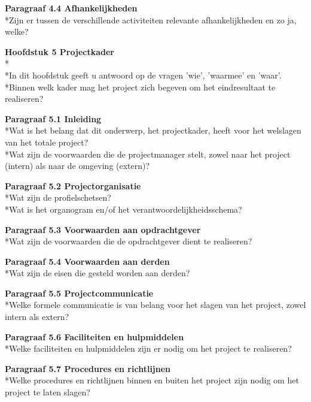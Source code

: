 \documentclass{article}
\begin{document}
\noindent
\textbf{Paragraaf 4.4 Afhankelijkheden}
\\*Zijn er tussen de verschillende activiteiten relevante afhankelijkheden en zo ja, welke?
\newline
\newline

\textbf{Hoofdstuk 5 Projectkader}
\\*
\\*In dit hoofdstuk geeft u antwoord op de vragen 'wie', 'waarmee' en 'waar'.
\\*Binnen welk kader mag het project zich begeven om het eindresultaat te realiseren?
\newline

\noindent
\textbf{Paragraaf 5.1 Inleiding}
\\*Wat is het belang dat dit onderwerp, het projectkader, heeft voor het welslagen van het totale project?
\\*Wat zijn de voorwaarden die de projectmanager stelt, zowel naar het project (intern) als naar de omgeving (extern)?
\newline

\noindent
\textbf{Paragraaf 5.2 Projectorganisatie}
\\*Wat zijn de profielschetsen?
\\*Wat is het organogram en/of het verantwoordelijkheidsschema?
\newline

\noindent
\textbf{Paragraaf 5.3 Voorwaarden aan opdrachtgever}
\\*Wat zijn de voorwaarden die de opdrachtgever dient te realiseren?
\newline

\noindent
\textbf{Paragraaf 5.4 Voorwaarden aan derden}
\\*Wat zijn de eisen die gesteld worden aan derden?
\newline

\noindent
\textbf{Paragraaf 5.5 Projectcommunicatie}
\\*Welke formele communicatie is van belang voor het slagen van het project, zowel intern als extern?
\newline

\noindent
\textbf{Paragraaf 5.6 Faciliteiten en hulpmiddelen}
\\*Welke faciliteiten en hulpmiddelen zijn er nodig om het project te realiseren?
\newline

\noindent
\textbf{Paragraaf 5.7 Procedures en richtlijnen}
\\*Welke procedures en richtlijnen binnen en buiten het project zijn nodig om het project te laten slagen?
\newline
\newline
\end{document}
